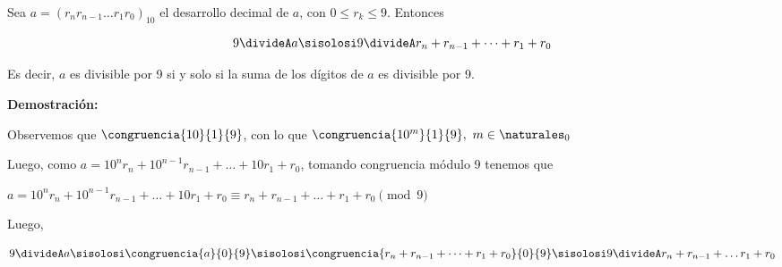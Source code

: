 \begin{itemize}
    Sea $a = (r_nr_{n-1} \dots r_1  r_0)_{10}$ el desarrollo decimal de $a$, con $0 \leq r_k \leq 9$.
    Entonces

    $$
    9 \divideA a
    \sisolosi
    9 \divideA r_n + r_{n-1} + \dots + r_1 + r_0
    $$

    Es decir, $a$ es divisible por 9 si y solo si la suma de los dígitos de $a$ es divisible por 9.

    \textbf{Demostración:}

    Observemos que $\congruencia{10}{1}{9}$, con lo que $\congruencia{10^m}{1}{9}, \ m \in \naturales_0$

    Luego, como $a = 10^{n}r_n+ 10^{n-1}r_{n-1} + \dots + 10r_1 + r_0$, tomando congruencia
    módulo 9 tenemos que

    $a = 10^{n}r_n+ 10^{n-1}r_{n-1} + \dots + 10r_1 + r_0 \equiv r_n + r_{n-1} + \dots + r_1 + r_0 \pmod 9 $

    Luego,

    $$
    9 \divideA a 
    \sisolosi
    \congruencia{a}{0}{9}
    \sisolosi
    \congruencia{r_n + r_{n-1} + \dots + r_1 + r_0}{0}{9}
    \sisolosi
    9 \divideA r_n + r_{n-1} + \dots r_1 + r_0
    $$

\end{itemize}